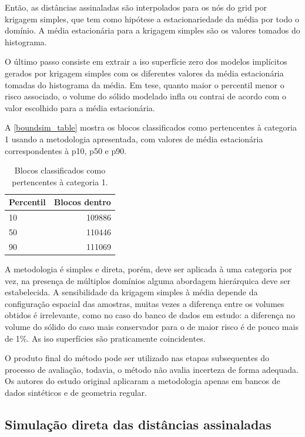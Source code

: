 Então, as distâncias assinaladas são interpolados para os nós do grid por krigagem simples, que tem como hipótese a estacionariedade da média por todo o domínio. A média estacionária para a krigagem simples são os valores tomados do histograma.

O último passo consiste em extrair a iso superfície zero dos modelos implícitos gerados por krigagem simples com os diferentes valores da média estacionária tomadas do histograma da média. Em tese, quanto maior o percentil menor o risco associado, o volume do sólido modelado infla ou contrai de acordo com o valor escolhido para a média estacionária.

A \autoref{boundsim_table} mostra os blocos classificados como pertencentes à categoria 1 usando a metodologia apresentada, com valores de média estacionária correspondentes à p10, p50 e p90.

\begin{table}[]
\begin{center}
\begin{tabular}{lr}
Percentil & \multicolumn{1}{l}{Blocos dentro} \\ \hline
10 & 109886 \\
50 & 110446 \\
90 & 111069 \\ \hline
\end{tabular}
\end{center}
\caption{Blocos classificados como pertencentes à categoria 1.}\label{boundsim_table}
\end{table}

A metodologia é simples e direta, porém, deve ser aplicada à uma categoria por vez, na presença de múltiplos domínios alguma abordagem hierárquica deve ser estabelecida. A sensibilidade da krigagem simples à média depende da configuração espacial das amostras, muitas vezes a diferença entre os volumes obtidos é irrelevante, como no caso do banco de dados em estudo: a diferença no volume do sólido do caso mais conservador para o de maior risco é de pouco mais de 1\%. As iso superfícies são praticamente coincidentes.

O produto final do método pode ser utilizado nas etapas subsequentes do processo de avaliação, todavia, o método não avalia incerteza de forma adequada. Os autores do estudo original aplicaram a metodologia apenas em bancos de dados sintéticos e de geometria regular. 

\subsection{Simulação direta das distâncias assinaladas}\label{sim_direta}

